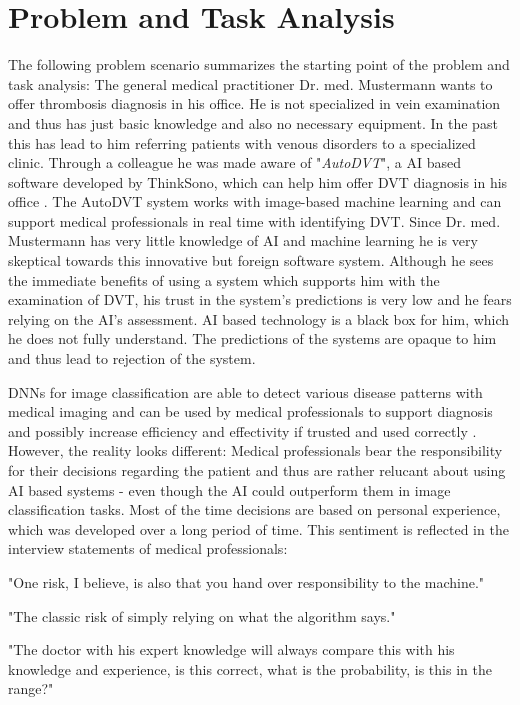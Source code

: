 \documentclass[11pt,a4paper,english]{scrreprt}
\begin{document}
\section{Problem and Task Analysis}
The following problem scenario summarizes the starting point of the problem and task analysis: The general medical practitioner Dr. med. Mustermann wants to offer thrombosis diagnosis in his office. He is not specialized in vein examination and thus has just basic knowledge and also no necessary equipment. In the past this has lead to him referring patients with venous disorders to a specialized clinic. Through a colleague he was made aware of "\textit{AutoDVT}", a AI based software developed by ThinkSono, which can help him offer DVT diagnosis in his office \parencite{thinksono_website}. The AutoDVT system works with image-based machine learning and can support medical professionals in real time with identifying DVT. Since Dr. med. Mustermann has very little knowledge of AI and machine learning he is very skeptical towards this innovative but foreign software system. Although he sees the immediate benefits of using a system which supports him with the examination of DVT, his trust in the system's predictions is very low and he fears relying on the AI's assessment. AI based technology is a black box for him, which he does not fully understand. The predictions of the systems are opaque to him and thus lead to rejection of the system.

DNNs for image classification are able to detect various disease patterns with medical imaging and can be used by medical professionals to support diagnosis and possibly increase efficiency and effectivity if trusted and used correctly \parencite{adadi_blackbox_2018,knapic_explainable_2021}. However, the reality looks different: Medical professionals bear the responsibility for their decisions regarding the patient and thus are rather relucant about using AI based systems - even though the AI could outperform them in image classification tasks. Most of the time decisions are based on personal experience, which was developed over a long period of time. This sentiment is reflected in the interview statements of medical professionals:
\begin{displayquote}
    "One risk, I believe, is also that you hand over responsibility to the machine."
\end{displayquote}
\begin{displayquote}
    "The classic risk of simply relying on what the algorithm says."
\end{displayquote}
\begin{displayquote}
    "The doctor with his expert knowledge will always compare this with his knowledge and experience, is this correct, what is the probability, is this in the range?"
\end{displayquote}
\end{document}
